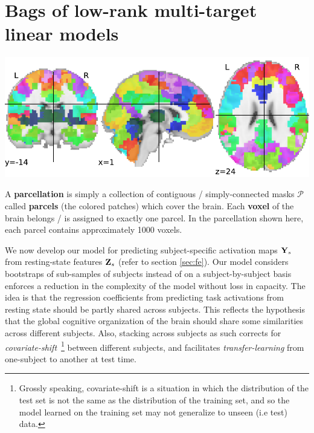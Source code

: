 \section{Bags of low-rank multi-target linear models}
\label{sec:bags}
\begin{marginfigure}
  \includegraphics[width=1\linewidth]{figures/parcellation_00.pdf}
  \caption{A \textbf{parcellation} is simply a collection of contiguous /
    simply-connected masks $\mathcal P$ called \textbf{parcels} (the colored patches)
    which cover the brain. Each \textbf{voxel} of the brain belongs / is assigned to exactly one
    parcel. In the parcellation shown here, each parcel contains approximately 1000 voxels.}
  \label{fig:parcels}
\end{marginfigure}
We now develop our model for predicting subject-specific activation maps $\mathbf{Y}_s$ from resting-state features $\mathbf{Z}_s$
(refer to section \ref{sec:fe}).
Our model considers bootstraps of sub-samples of subjects instead of on a subject-by-subject
basis enforces a reduction in the complexity of the model without loss in capacity.
The idea is that the regression coefficients from predicting task activations
from resting state should be partly shared across subjects. 
%
This reflects the hypothesis that the global cognitive organization of the brain should share some
similarities across different subjects. Also, stacking across subjects as such corrects for \textit{covariate-shift}~\footnote{Grossly speaking, covariate-shift is a situation in which the distribution of the test set is not the same as the distribution of the training set, and so the model learned on the training set may not generalize to unseen (i.e test) data.}
between different subjects, and facilitates \textit{transfer-learning} from one-subject to another at test time.

